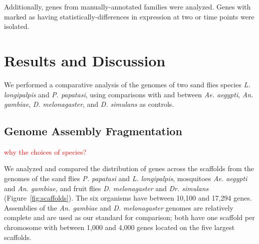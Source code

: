 Additionally, genes from manually-annotated families were analyzed.  Genes with marked as having statistically-differences in expression at two or time points were isolated.

\section{Results and Discussion}
We performed a comparative analysis of the genomes of two sand flies species \emph{L. longipalpis} and \emph{P. papatasi}, using comparisons with and between \emph{Ae. aegypti}, \emph{An. gambiae}, \emph{D. melonagaster}, and \emph{D. simulans} as controls.

\subsection{Genome Assembly Fragmentation}


\textcolor{red}{why the choices of species?}

We analyzed and compared the distribution of genes across the scaffolds from the genomes of the sand flies \emph{P. papatasi} and \emph{L. longipalpis}, mosquitoes \emph{Ae. aegypti} and \emph{An. gambiae}, and fruit flies \emph{D. melonagaster} and \emph{Dr. simulans} (Figure~\ref{fig:scaffolds}).  The six organisms have between 10,100 and 17,294 genes.  Assemblies of the \emph{An. gambiae} and \emph{D. melonagaster} genomes are relatively complete and are used as our standard for comparison; both have one scaffold per chromosome with between 1,000 and 4,000 genes located on the five largest scaffolds.

